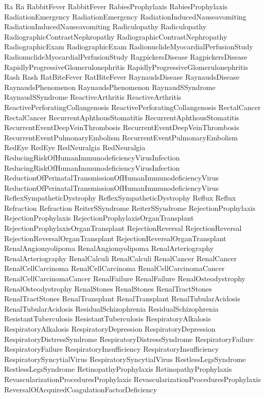  Ra
 Ra
 RabbitFever
 RabbitFever
 RabiesProphylaxis
 RabiesProphylaxis
 RadiationEmergency
 RadiationEmergency
 RadiationInducedNauseavomiting
 RadiationInducedNauseavomiting
 Radiculopathy
 Radiculopathy
 RadiographicContrastNephropathy
 RadiographicContrastNephropathy
 RadiographicExam
 RadiographicExam
 RadionuclideMyocardialPerfusionStudy
 RadionuclideMyocardialPerfusionStudy
 RagpickersDisease
 RagpickersDisease
 RapidlyProgressiveGlomerulonephritis
 RapidlyProgressiveGlomerulonephritis
 Rash
 Rash
 RatBiteFever
 RatBiteFever
 RaynaudsDisease
 RaynaudsDisease
 RaynaudsPhenomenon
 RaynaudsPhenomenon
 RaynaudSSyndrome
 RaynaudSSyndrome
 ReactiveArthritis
 ReactiveArthritis
 ReactivePerforatingCollangenosis
 ReactivePerforatingCollangenosis
 RectalCancer
 RectalCancer
 RecurrentAphthousStomatitis
 RecurrentAphthousStomatitis
 RecurrentEventDeepVeinThrombosis
 RecurrentEventDeepVeinThrombosis
 RecurrentEventPulmonaryEmbolism
 RecurrentEventPulmonaryEmbolism
 RedEye
 RedEye
 RedNeuralgia
 RedNeuralgia
 ReducingRiskOfHumanImmunodeficiencyVirusInfection
 ReducingRiskOfHumanImmunodeficiencyVirusInfection
 ReductionOfPerinatalTransmissionOfHumanImmunodeficiencyVirus
 ReductionOfPerinatalTransmissionOfHumanImmunodeficiencyVirus
 ReflexSympatheticDystrophy
 ReflexSympatheticDystrophy
 Reflux
 Reflux
 Refraction
 Refraction
 ReiterSSyndrome
 ReiterSSyndrome
 RejectionProphylaxis
 RejectionProphylaxis
 RejectionProphylaxisOrganTransplant
 RejectionProphylaxisOrganTransplant
 RejectionReversal
 RejectionReversal
 RejectionReversalOrganTransplant
 RejectionReversalOrganTransplant
 RenalAngiomyolipoma
 RenalAngiomyolipoma
 RenalArteriography
 RenalArteriography
 RenalCalculi
 RenalCalculi
 RenalCancer
 RenalCancer
 RenalCellCarcinoma
 RenalCellCarcinoma
 RenalCellCarcinomaCancer
 RenalCellCarcinomaCancer
 RenalFailure
 RenalFailure
 RenalOsteodystrophy
 RenalOsteodystrophy
 RenalStones
 RenalStones
 RenalTractStones
 RenalTractStones
 RenalTransplant
 RenalTransplant
 RenalTubularAcidosis
 RenalTubularAcidosis
 ResidualSchizophrenia
 ResidualSchizophrenia
 ResistantTuberculosis
 ResistantTuberculosis
 RespiratoryAlkalosis
 RespiratoryAlkalosis
 RespiratoryDepression
 RespiratoryDepression
 RespiratoryDistressSyndrome
 RespiratoryDistressSyndrome
 RespiratoryFailure
 RespiratoryFailure
 RespiratoryInsufficiency
 RespiratoryInsufficiency
 RespiratorySyncytialVirus
 RespiratorySyncytialVirus
 RestlessLegsSyndrome
 RestlessLegsSyndrome
 RetinopathyProphylaxis
 RetinopathyProphylaxis
 RevascularizationProceduresProphylaxis
 RevascularizationProceduresProphylaxis
 ReversalOfAcquiredCoagulationFactorDeficiency

